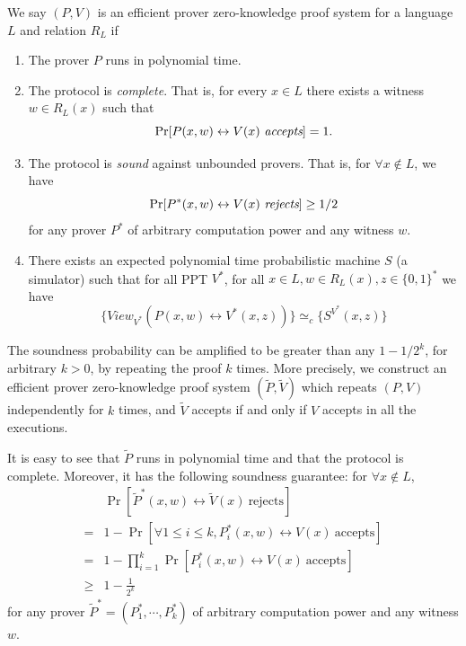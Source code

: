 \begin{definition}
We say $(P, V)$ is an efficient prover zero-knowledge proof system for a language $L$ and relation $R_L$ if \begin{enumerate}

\item The prover $P$ runs in polynomial time.

\item The protocol is \emph{complete}. That is, for every $x \in L$ there exists a witness $w \in R_L (x)$ such that $$\Pr [P(x,w) \leftrightarrow V(x) \ \emph{accepts}] = 1.$$

\item The protocol is \emph{sound} against unbounded provers. That is, for $\forall x \notin L$, we have $$\Pr [P^*(x,w) \leftrightarrow V(x) \ \emph{rejects}] \geq 1/2$$ for any prover $P^*$ of arbitrary computation power and any witness $w$.

\item There exists an expected polynomial time probabilistic machine $S$ (a simulator) such that for all PPT $V^*$, for all $x \in L, w \in R_L (x), z \in \{ 0, 1 \}^*$ we have $$\{ View_{V^*} (P(x,w) \leftrightarrow V^* (x,z)) \} \simeq_c \{ S^{V^*} (x,z) \} $$ \end{enumerate}

\end{definition}

The soundness probability can be amplified to be greater than any $1 - 1/2^k$, for arbitrary $k > 0$, by repeating the proof $k$ times. More precisely, we construct an efficient prover zero-knowledge proof system $(\tilde P, \tilde V)$ which repeats $(P,V)$ independently for $k$ times, and $\tilde V$ accepts if and only if $V$ accepts in all the executions.

It is easy to see that $\tilde P$ runs in polynomial time and that the protocol is complete.
Moreover, it has the following soundness guarantee:
for $\forall x \notin L$,
\begin{align*}
& \Pr \left[\tilde P^*(x,w) \leftrightarrow \tilde V(x) \ \text{rejects}\right]\\
= & 1- \Pr \left[\forall 1\leq i\leq k, P^*_i(x,w) \leftrightarrow V(x) \ \text{accepts}\right] \\
= & 1- \prod_{i=1}^k \Pr \left[P^*_i(x,w) \leftrightarrow V(x) \ \text{accepts}\right] \\
\geq& 1-\frac{1}{2^k}
\end{align*}
for any prover $\tilde P^*=(P^*_1, \cdots, P^*_k)$ of arbitrary computation power and any witness $w$.

